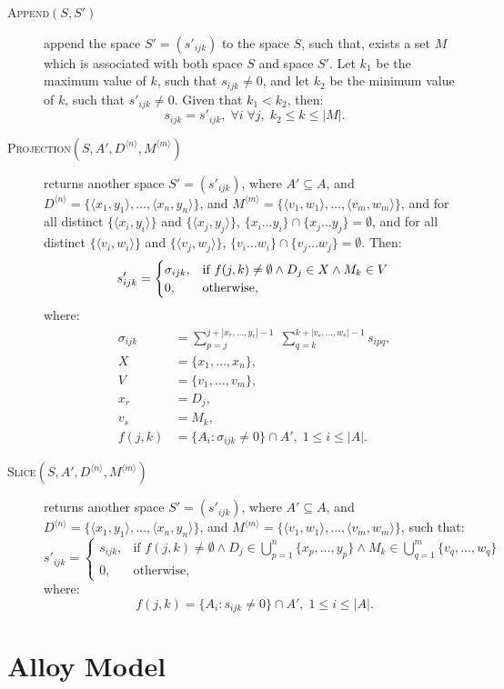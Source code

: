 \documentclass{article}
\begin{document}
\begin{description}
	\item[\textsc{Append}$(S,S')$] append the space
	$S'=\left(s'_{ijk}\right)$ to the space $S$,
		such that, exists a set $M$ which is associated with both space $S$ and
		space $S'$. Let $k_1$ be the maximum value of $k$, such that
		$s_{ijk} \neq 0$, and let $k_2$ be the minimum value of $k$,
		such that $s'_{ijk} \neq 0$. Given that $k_1 < k_2$, then:
		\[
			s_{ijk} = s'_{ijk}, \; \forall i \; \forall j, \; k_2 \leq k \leq |M|.
		\]

	\item[\textsc{Projection}$(S, A', D^{\langle n \rangle}, M^{\langle m \rangle})$] 
		returns another space $S'=\left(s'_{ijk}\right)$,
		where $A' \subseteq A$, and $D^{\langle n \rangle} = 
		\{\langle x_1, y_1 \rangle, \ldots, \langle x_n, y_n \rangle\}$, and
		$M^{\langle m \rangle} = 
		\{\langle v_1, w_1 \rangle, \ldots, \langle v_m, w_m \rangle \}$, and
		for all distinct $\{\langle x_i, y_i \rangle\}$ and $\{\langle x_j, y_j \rangle\}$,
		$\{x_i \ldots y_i\} \cap \{x_j \ldots y_j\} = \emptyset$, and
		for all distinct $\{\langle v_i, w_i \rangle\}$ and $\{\langle v_j, w_j \rangle\}$,
		$\{v_i \ldots w_i\} \cap \{v_j \ldots w_j\} = \emptyset$. Then:
		\[
			s'_{ijk} = 
			\begin{cases}
				\sigma_{ijk}, & 
					\text{if } f(j, k) \neq \emptyset \land 
						D_j \in X \land M_k \in V \\
				0, & \text{otherwise},
			\end{cases} \\
		\]
		where:
		\begin{align*}
			\sigma_{ijk} &= \sum_{p=j}^{j+|x_r, \ldots, y_r|-1} \;
				{\sum_{q=k}^{k+|v_s, \ldots, w_s|-1}{s_{ipq}}}, \\
			X &= \{ x_1, \ldots, x_n \}, \\
			V &= \{ v_1, \ldots, v_m \}, \\
			x_r &= D_j, \\
			v_s &= M_k, \\
			f(j,k) &= \{ A_i : \sigma_{ijk} \neq 0 \} \cap A', \; 1 \leq i \leq |A|.
		\end{align*}

	\item[\textsc{Slice}$(S, A', D^{\langle n \rangle}, M^{\langle m \rangle})$] 
		returns another space $S'=\left(s'_{ijk}\right)$, 
		where $A' \subseteq A $, and $D^{\langle n \rangle} = 
		\{\langle x_1, y_1 \rangle, \ldots, \langle x_n, y_n \rangle\}$, and
		$M^{\langle m \rangle} = 
		\{\langle v_1, w_1 \rangle, \ldots, \langle v_m, w_m \rangle \}$,
		such that:
		\[
			s'_{ijk} = 
			\begin{cases}
				s_{ijk}, & \text{if } 
					f(j, k) \neq \emptyset \land
					D_j \in \bigcup\limits_{p=1}^{n} \{ x_p, \ldots, y_p \} \land 
					M_k \in \bigcup\limits_{q=1}^{m} \{ v_q, \ldots, w_q \} \\
				0, & \text{otherwise},
			\end{cases}
		\]
		where:
		\[
			f(j,k) = \{ A_i : s_{ijk} \neq 0 \} \cap A', \; 1 \leq i \leq |A|.
		\]

\end{description}

\section{Alloy Model} %
\label{sec:alloy_model}


\end{document}
